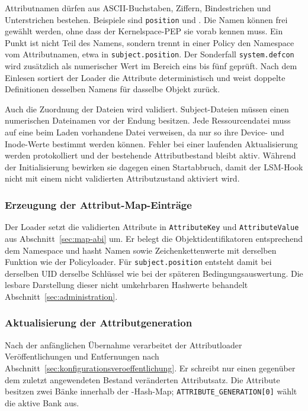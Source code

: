 Attributnamen dürfen aus ASCII-Buchstaben, Ziffern, Bindestrichen und Unterstrichen bestehen. Beispiele sind \texttt{position} und . Die Namen können frei gewählt werden, ohne dass der Kernelspace-PEP sie vorab kennen muss. Ein Punkt ist nicht Teil des Namens, sondern trennt in einer Policy den Namespace vom Attributnamen, etwa in \texttt{subject.position}. Der Sonderfall \texttt{system.defcon} wird zusätzlich als numerischer Wert im Bereich eins bis fünf geprüft. Nach dem Einlesen sortiert der Loader die Attribute deterministisch und weist doppelte Definitionen desselben Namens für dasselbe Objekt zurück.

Auch die Zuordnung der Dateien wird validiert. Subject-Dateien müssen einen numerischen Dateinamen vor der Endung besitzen. Jede Ressourcendatei muss auf eine beim Laden vorhandene Datei verweisen, da nur so ihre Device- und Inode-Werte bestimmt werden können. Fehler bei einer laufenden Aktualisierung werden protokolliert und der bestehende Attributbestand bleibt aktiv. Während der Initialisierung bewirken sie dagegen einen Startabbruch, damit der LSM-Hook nicht mit einem nicht validierten Attributzustand aktiviert wird.

\subsubsection{Erzeugung der Attribut-Map-Einträge}
Der Loader setzt die validierten Attribute in \texttt{AttributeKey} und \texttt{AttributeValue} aus Abschnitt~\ref{sec:map-abi} um. Er belegt die Objektidentifikatoren entsprechend dem Namespace und hasht Namen sowie Zeichenkettenwerte mit derselben Funktion wie der Policyloader. Für \texttt{subject.position} entsteht damit bei derselben UID derselbe Schlüssel wie bei der späteren Bedingungsauswertung. Die lesbare Darstellung dieser nicht umkehrbaren Hashwerte behandelt Abschnitt~\ref{sec:administration}.

\subsubsection{Aktualisierung der Attributgeneration}
Nach der anfänglichen Übernahme verarbeitet der Attributloader Veröffentlichungen und Entfernungen nach Abschnitt~\ref{sec:konfigurationsveroeffentlichung}. Er schreibt nur einen gegenüber dem zuletzt angewendeten Bestand veränderten Attributsatz. Die Attribute besitzen zwei Bänke innerhalb der -Hash-Map; \texttt{ATTRIBUTE\_GENERATION[0]} wählt die aktive Bank aus.

